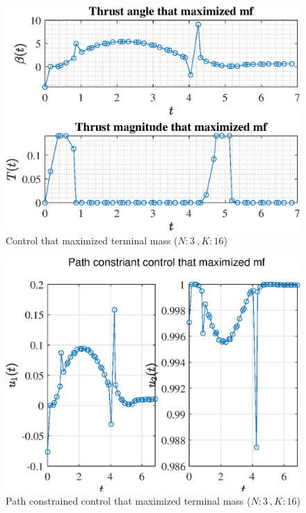 \documentclass[]{article}
\begin{document}
	\begin{figure}
		\centering
		\includegraphics[scale=0.75]{control_N3_K16_C3_mf.eps}
		\caption{Control that maximized terminal mass (\(N:3\ , K:16\))}
		\label{fig:control_N3_K16_C3_mf}
	\end{figure}
	\begin{figure}
		\centering
		\includegraphics[scale=0.75]{path_N3_K16_C3_mf.eps}
		\caption{Path constrained control that maximized terminal mass (\(N:3\ , K:16\))}
		\label{fig:path_N3_K16_C3_mf}
	\end{figure}
\end{document}
